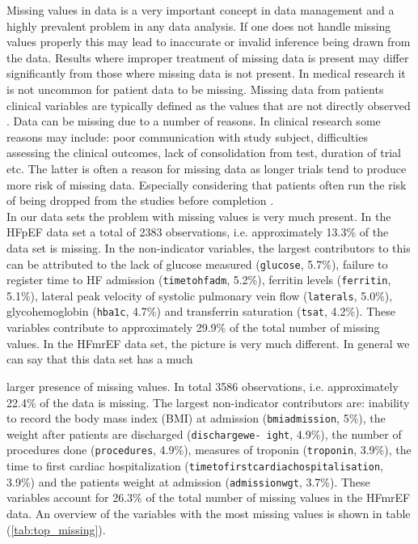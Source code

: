 \documentclass[../thesis.tex]{subfiles}
\begin{document}
\noindent Missing values in data is a very important concept in data management and a highly prevalent problem in any data analysis. If one does not handle missing values properly this may lead to inaccurate or invalid inference being drawn from the data. Results where improper treatment of missing data is present may differ significantly from those where missing data is not present. In medical research it is not uncommon for patient data to be missing. Missing data from patients clinical variables are typically defined as the values that are not directly observed \citep{ibrahim2012missing}. Data can be missing due to a number of reasons. In clinical research some reasons may include: poor communication with study subject, difficulties assessing the clinical outcomes, lack of consolidation from test, duration of trial etc. The latter is often a reason for missing data as longer trials tend to produce more risk of missing data. Especially considering that patients often run the risk of being dropped from the studies before completion \citep{myers2000handling}.\\
\indent In our data sets the problem with missing values is very much present. In the HFpEF data set a total of 2383 observations, i.e. approximately 13.3\% of the data set is missing. In the non-indicator variables, the largest contributors to this can be attributed to the lack of glucose measured (\texttt{glucose}, 5.7\%), failure to register time to HF admission (\texttt{timetohfadm}, 5.2\%), ferritin levels (\texttt{ferritin}, 5.1\%), lateral peak velocity of systolic pulmonary vein flow (\texttt{laterals}, 5.0\%), glycohemoglobin (\texttt{hba1c}, 4.7\%) and transferrin saturation (\texttt{tsat}, 4.2\%). These variables contribute to approximately 29.9\% of the total number of missing values. In the HFmrEF data set, the picture is very much different. In general we can say that this data set has a much  



\noindent larger presence of missing values. In total 3586 observations, i.e. approximately 22.4\% of the data is missing. The largest non-indicator contributors are: inability to record the body mass index (BMI) at admission (\texttt{bmiadmission}, 5\%), the weight after patients are discharged (\texttt{dischargewe- ight}, 4.9\%), the number of procedures done (\texttt{procedures}, 4.9\%), measures of troponin (\texttt{troponin}, 3.9\%), the time to first cardiac hospitalization (\texttt{timetofirstcardiachospitalisation}, 3.9\%) and the patients weight at admission (\texttt{admissionwgt}, 3.7\%). These variables account for 26.3\% of the total number of missing values in the HFmrEF data. An overview of the variables with the most missing values is shown in table (\ref{tab:top_missing}).
\end{document}
